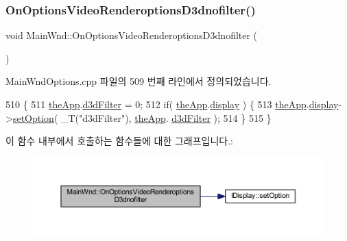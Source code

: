 \subsubsection{\texorpdfstring{On\+Options\+Video\+Renderoptions\+D3dnofilter()}{OnOptionsVideoRenderoptionsD3dnofilter()}}
{\footnotesize\ttfamily void Main\+Wnd\+::\+On\+Options\+Video\+Renderoptions\+D3dnofilter (\begin{DoxyParamCaption}{ }\end{DoxyParamCaption})\hspace{0.3cm}{\ttfamily [protected]}}



Main\+Wnd\+Options.\+cpp 파일의 509 번째 라인에서 정의되었습니다.


\begin{DoxyCode}
510 \{
511     \mbox{\hyperlink{_v_b_a_8cpp_a8095a9d06b37a7efe3723f3218ad8fb3}{theApp}}.\mbox{\hyperlink{class_v_b_a_a8563e53b73a28a011e656f6fc8a4e5ff}{d3dFilter}} = 0;
512     \textcolor{keywordflow}{if}( \mbox{\hyperlink{_v_b_a_8cpp_a8095a9d06b37a7efe3723f3218ad8fb3}{theApp}}.\mbox{\hyperlink{class_v_b_a_a940e5bad8b3ed2436888dbcd03bfd563}{display}} ) \{
513         \mbox{\hyperlink{_v_b_a_8cpp_a8095a9d06b37a7efe3723f3218ad8fb3}{theApp}}.\mbox{\hyperlink{class_v_b_a_a940e5bad8b3ed2436888dbcd03bfd563}{display}}->\mbox{\hyperlink{class_i_display_a1766244708c252bb8781892c76c20ba9}{setOption}}( \_T(\textcolor{stringliteral}{"d3dFilter"}), \mbox{\hyperlink{_v_b_a_8cpp_a8095a9d06b37a7efe3723f3218ad8fb3}{theApp}}.
      \mbox{\hyperlink{class_v_b_a_a8563e53b73a28a011e656f6fc8a4e5ff}{d3dFilter}} );
514     \}
515 \}
\end{DoxyCode}
이 함수 내부에서 호출하는 함수들에 대한 그래프입니다.\+:
\nopagebreak
\begin{figure}[H]
\begin{center}
\leavevmode
\includegraphics[width=350pt]{class_main_wnd_add9253b241396c29c979ef81199b7fb3_cgraph}
\end{center}
\end{figure}
\mbox{\label{class_main_wnd_afff6d21ce58320731fae2b0f38390640}} 
